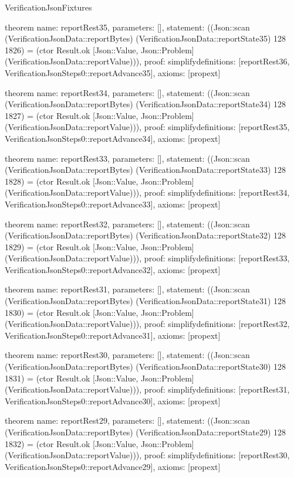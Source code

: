 \begin{lexlean}{VerificationJsonFixtures}
\begin{semanticmodule}
theorem{
  name: reportRest35,
  parameters: [],
  statement: ((Json::scan (VerificationJsonData::reportBytes) (VerificationJsonData::reportState35) 128 1826) = (ctor Result.ok [Json::Value, Json::Problem] (VerificationJsonData::reportValue))),
  proof: simplify{definitions: [reportRest36, VerificationJsonSteps0::reportAdvance35]},
  axioms: [propext]
}

theorem{
  name: reportRest34,
  parameters: [],
  statement: ((Json::scan (VerificationJsonData::reportBytes) (VerificationJsonData::reportState34) 128 1827) = (ctor Result.ok [Json::Value, Json::Problem] (VerificationJsonData::reportValue))),
  proof: simplify{definitions: [reportRest35, VerificationJsonSteps0::reportAdvance34]},
  axioms: [propext]
}

theorem{
  name: reportRest33,
  parameters: [],
  statement: ((Json::scan (VerificationJsonData::reportBytes) (VerificationJsonData::reportState33) 128 1828) = (ctor Result.ok [Json::Value, Json::Problem] (VerificationJsonData::reportValue))),
  proof: simplify{definitions: [reportRest34, VerificationJsonSteps0::reportAdvance33]},
  axioms: [propext]
}

theorem{
  name: reportRest32,
  parameters: [],
  statement: ((Json::scan (VerificationJsonData::reportBytes) (VerificationJsonData::reportState32) 128 1829) = (ctor Result.ok [Json::Value, Json::Problem] (VerificationJsonData::reportValue))),
  proof: simplify{definitions: [reportRest33, VerificationJsonSteps0::reportAdvance32]},
  axioms: [propext]
}

theorem{
  name: reportRest31,
  parameters: [],
  statement: ((Json::scan (VerificationJsonData::reportBytes) (VerificationJsonData::reportState31) 128 1830) = (ctor Result.ok [Json::Value, Json::Problem] (VerificationJsonData::reportValue))),
  proof: simplify{definitions: [reportRest32, VerificationJsonSteps0::reportAdvance31]},
  axioms: [propext]
}

theorem{
  name: reportRest30,
  parameters: [],
  statement: ((Json::scan (VerificationJsonData::reportBytes) (VerificationJsonData::reportState30) 128 1831) = (ctor Result.ok [Json::Value, Json::Problem] (VerificationJsonData::reportValue))),
  proof: simplify{definitions: [reportRest31, VerificationJsonSteps0::reportAdvance30]},
  axioms: [propext]
}

theorem{
  name: reportRest29,
  parameters: [],
  statement: ((Json::scan (VerificationJsonData::reportBytes) (VerificationJsonData::reportState29) 128 1832) = (ctor Result.ok [Json::Value, Json::Problem] (VerificationJsonData::reportValue))),
  proof: simplify{definitions: [reportRest30, VerificationJsonSteps0::reportAdvance29]},
  axioms: [propext]
}


\end{semanticmodule}
\end{lexlean}
